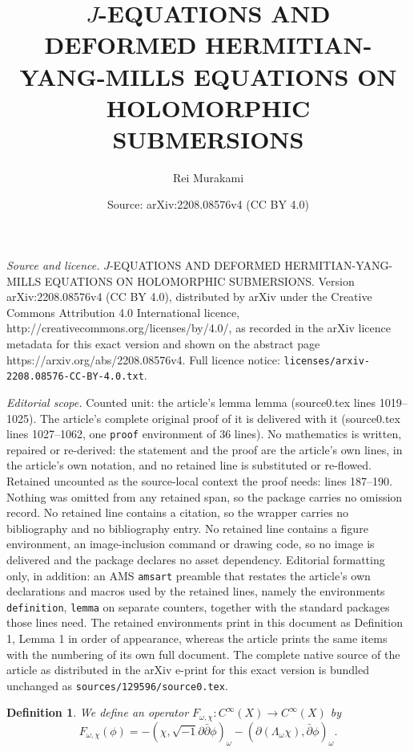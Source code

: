 \documentclass[10pt,a4paper]{amsart}
\title{$J$-EQUATIONS AND DEFORMED HERMITIAN-YANG-MILLS EQUATIONS ON HOLOMORPHIC SUBMERSIONS}
\author{Rei Murakami}
\date{Source: arXiv:2208.08576v4 (CC BY 4.0)}
\newtheorem{definition}{Definition}
\begin{document}
\maketitle

\noindent\emph{Source and licence.} $J$-EQUATIONS AND DEFORMED HERMITIAN-YANG-MILLS EQUATIONS ON HOLOMORPHIC SUBMERSIONS. Version arXiv:2208.08576v4 (CC BY 4.0), distributed by arXiv under the Creative Commons Attribution 4.0 International licence, http://creativecommons.org/licenses/by/4.0/, as recorded in the arXiv licence metadata for this exact version and shown on the abstract page https://arxiv.org/abs/2208.08576v4. Full licence notice: \texttt{licenses/arxiv-2208.08576-CC-BY-4.0.txt}.\par\smallskip

\noindent\textit{Editorial scope.} Counted unit: the article's lemma lemma (source0.tex lines 1019--1025). The article's complete original proof of it is delivered with it (source0.tex lines 1027--1062, one \texttt{proof} environment of 36 lines). No mathematics is written, repaired or re-derived: the statement and the proof are the article's own lines, in the article's own notation, and no retained line is substituted or re-flowed.  Retained uncounted as the source-local context the proof needs: lines 187--190.  Nothing was omitted from any retained span, so the package carries no omission record.  No retained line contains a citation, so the wrapper carries no bibliography and no bibliography entry.  No retained line contains a figure environment, an image-inclusion command or drawing code, so no image is delivered and the package declares no asset dependency.  Editorial formatting only, in addition: an AMS \texttt{amsart} preamble that restates the article's own declarations and macros used by the retained lines, namely the environments \texttt{definition}, \texttt{lemma} on separate counters, together with the standard packages those lines need.  The retained environments print in this document as Definition 1, Lemma 1 in order of appearance, whereas the article prints the same items with the numbering of its own full document.  The complete native source of the article as distributed in the arXiv e-print for this exact version is bundled unchanged as \texttt{sources/129596/source0.tex}.
\begin{definition}\label{def:F-op}
We define an operator $F_{\omega, \chi} : C^{\infty}(X) \rightarrow C^{\infty}(X) $ by 
$$F_{\omega, \chi} (\phi) = {-{ \left( \chi , {\sqrt{-1} \partial \bar{\partial} \phi} \right)_\omega} - \left( \partial \left( \Lambda_\omega \chi \right) , \bar{\partial} \phi \right)_\omega }. $$
\end{definition}
\end{document}
